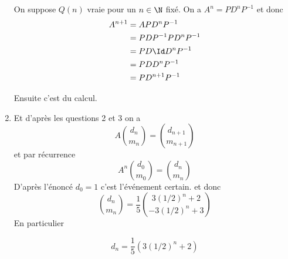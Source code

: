 \begin{correction}
\begin{enumerate}
On suppose $Q(n) $ vraie pour un $n \in \N$ fixé. On a 
$A^{n} =   P D^n P^{-1}$ et donc
\begin{align*}
A^{n+1} &=A P D^n P^{-1}\\
&=PDP^{-1} P D^n P^{-1} \\
&= PD \Id D^n P^{-1}  \\
&=PD  D^n P^{-1}\\
&=PD^{n+1} P^{-1}
\end{align*}

Ensuite c'est du calcul. 
\item 
Et d'après les questions 2 et 3 on  a
$$A \binom{d_n}{m_n}= \binom{d_{n+1}}{m_{n+1}}$$
et par récurrence 
$$A^n \binom{d_0}{m_0}= \binom{d_n}{m_n}$$
D'après l'énoncé $d_0= 1$ c'est l'événement certain. 
et donc $$ \binom{d_n}{m_n}= 
\frac{1}{5} \binom{3\left( 1/2\right)^n +2 }{-3\left( 1/2\right)^n +3}$$
En particulier 

$$d_n=\frac{1}{5} (3\left( 1/2\right)^n +2) $$

\end{enumerate}
\end{correction}